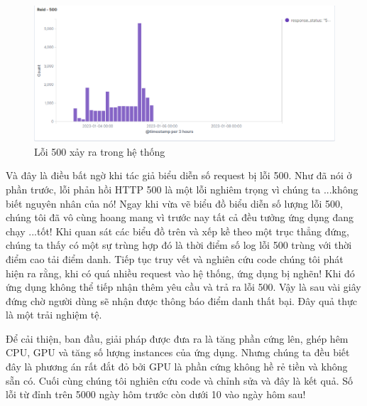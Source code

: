 \begin{figure}[H] %
    \centering %
    \includegraphics[width=1\textwidth]{figures/log-500.png} 
    \caption{Lỗi 500 xảy ra trong hệ thống} %
    \label{fig:elk_01}
\end{figure}

Và đây là điều bất ngờ khi tác giả biểu diễn số request bị lỗi 500. Như đã nói ở phần trước, lỗi phản hồi HTTP 500 là một lỗi nghiêm trọng vì chúng ta ...không biết nguyên nhân của nó! Ngay khi vừa vẽ biểu đồ biểu diễn số lượng lỗi 500, chúng tôi đã vô cùng hoang mang vì trước nay tất cả đều tưởng ứng dụng đang chạy ...tốt! Khi quan sát các biểu đồ trên và xếp kề theo một trục thẳng đứng, chúng ta thấy có một sự trùng hợp đó là thời điểm số log lỗi 500 trùng với thời điểm cao tải điểm danh. Tiếp tục truy vết và nghiên cứu code chúng tôi phát hiện ra rằng, khi có quá nhiều request vào hệ thống, ứng dụng bị nghẽn! Khi đó ứng dụng không thể tiếp nhận thêm yêu cầu và trả ra lỗi 500. Vậy là sau vài giây đứng chờ người dùng sẽ nhận được thông báo điểm danh thất bại. Đây quả thực là một trải nghiệm tệ. 

Để cải thiện, ban đầu, giải pháp được đưa ra là tăng phần cứng lên, ghép hêm CPU, GPU và tăng số lượng instances của ứng dụng. Nhưng chúng ta đều biết đây là phương án rất đắt đỏ bởi GPU là phần cứng không hề rẻ tiền và không sẵn có. Cuối cùng chúng tôi nghiên cứu code và chỉnh sửa và đây là kết quả. Số lỗi từ đỉnh trên 5000 ngày hôm trước còn dưới 10 vào ngày hôm sau!

